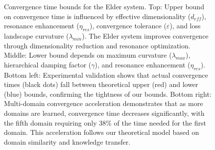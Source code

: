 \begin{figure}[t]
\begin{tikzpicture}[scale=0.85, transform shape]
\end{tikzpicture}
\caption{Convergence time bounds for the Elder system. Top: Upper bound on convergence time is influenced by effective dimensionality ($d_{eff}$), resonance enhancement ($\eta_{res}$), convergence tolerance ($\varepsilon$), and loss landscape curvature ($\lambda_{min}$). The Elder system improves convergence through dimensionality reduction and resonance optimization. Middle: Lower bound depends on maximum curvature ($\lambda_{max}$), hierarchical damping factor ($\gamma$), and resonance enhancement ($\eta_{res}$). Bottom left: Experimental validation shows that actual convergence times (black dots) fall between theoretical upper (red) and lower (blue) bounds, confirming the tightness of our bounds. Bottom right: Multi-domain convergence acceleration demonstrates that as more domains are learned, convergence time decreases significantly, with the fifth domain requiring only 38\% of the time needed for the first domain. This acceleration follows our theoretical model based on domain similarity and knowledge transfer.}
\label{fig:convergence_time_bounds}
\end{figure}